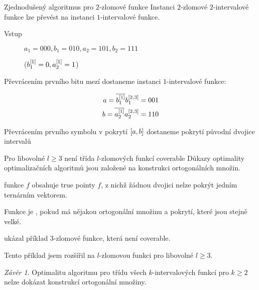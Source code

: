 \documentclass{beamer}
\theoremstyle{remark}
\newtheorem{conclusion}{Závěr}
\begin{document}
\begin{frame}{Zjednodušený algoritmus pro $2$-zlomové funkce}
Instanci $2$-zlomové $2$-intervalové funkce lze převést na instanci $1$-intervalové funkce.


\begin{example}
\begin{description}
\item[Vstup]
$a_1 = 000, b_1 = 010, a_2 = 101, b_2 = 111$

($b_1^{[1]} = 0, a_2^{[1]} = 1$)
\end{description}

Převrácením prvního bitu mezí dostaneme instanci $1$-intervalové funkce:

\begin{align*}
a = \overline{b_1^{[1]}} b_1^{[2, 3]} = 001 \\
b = \overline{a_2^{[1]}} a_2^{[2, 3]} = 110
\end{align*}

Převrácením prvního symbolu v pokrytí $[a, b]$ dostaneme pokrytí původní dvojice intervalů
\end{example}

\end{frame}

\begin{frame}{Pro libovolné $l \geq 3$ není třída $l$-zlomových funkcí coverable}
Důkazy optimality optimalizačních algoritmů jsou založené na konstrukci ortogonálních množin.

\begin{definition}
 funkce $f$ obsahuje true pointy $f$,
z nichž žádnou dvojici nelze pokrýt jedním ternárním vektorem.

Funkce je ,
pokud má nějakou ortogonální množinu a pokrytí, které jsou stejně velké.
\end{definition}

\citet{Dubovsky2012} ukázal příklad $3$-zlomové funkce,
která není coverable.

Tento příklad jsem rozšířil na $l$-zlomovou funkci pro libovolné $l \geq 3$.

\begin{conclusion}
Optimalitu algoritmu pro třídu všech $k$-intervalových funkcí pro $k \geq 2$ nelze dokázat konstrukcí ortogonální množiny.
\end{conclusion}
\end{frame}
\end{document}
